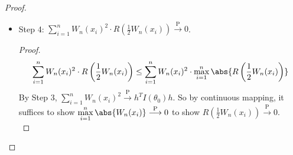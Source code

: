 \documentclass[a4paper]{article}
\begin{document}
\begin{proof}
\begin{itemize}[leftmargin=*]
		\begin{proof}
			Define $A_n(x_i) = W_n(x_i) - \frac{1}{\sqrt{n}} \ \dot{l} (x_i)^T h$. By the variance computation of Step 2, we have $n \cdot \mathbb{E}_{\theta_0} \left[A_n(x_i)^2\right] \to 0$ under $\theta_0$ $(\ast)$. Write
			\begin{equation*}
				\begin{aligned}
					W_n(x_i)^2 &= \left(A_n(x_i) + \frac{1}{\sqrt{n}} \ \dot{l} (x_i)^T h\right)^2 \\
					&= \frac{1}{n} \left(\dot{l} (x_i)^T h\right)^2 + \frac{2}{\sqrt{n}} \dot{l}(x_i)^T h \cdot A_n(x_i) + A_n(x_i)^2.
				\end{aligned}
			\end{equation*}
			Then
			\begin{equation*}
				\sum\limits_{i=1}^n W_n(x_i)^2 = \sum\limits_{i=1}^n \frac{1}{n} \left(\dot{l} (x_i)^T h\right)^2 + \sum\limits_{i=1}^n A_n(x_i)^2 + 2 \cdot \sum\limits_{i=1}^n \frac{1}{\sqrt{n}} \dot{l}(x_i)^T h \cdot A_n(x_i).
			\end{equation*}
			Since
			\begin{itemize}
				\item $\sum\limits_{i=1}^n \frac{1}{n} \left(\dot{l} (x_i)^T h\right)^2 \stackrel{\text{P}}{\longrightarrow} h^T I(\theta_0) h$ by Weak Law of Large Numbers.
				\item $\sum\limits_{i=1}^n A_n(x_i)^2 \stackrel{\text{P}}{\longrightarrow} 0$ by $(\ast)$ and Markov's Inequality.
				\item $ \sum\limits_{i=1}^n \frac{1}{\sqrt{n}} \dot{l}(x_i)^T h \cdot A_n(x_i) \stackrel{\text{P}}{\longrightarrow} 0$ by Cauchy–Schwarz Inequality.
			\end{itemize}
			We conclude that $\sum\limits_{i=1}^n W_n(x_i)^2 \stackrel{\text{P}}{\longrightarrow}h^T I(\theta_0) h$.
		\end{proof}
		\item Step 4: $\sum\limits_{i=1}^n W_n(x_i)^2 \cdot R\left(\frac{1}{2} W_n(x_i) \right) \stackrel{\text{P}}{\longrightarrow} 0$.
		\begin{proof}
			\begin{equation*}
				\sum\limits_{i=1}^n W_n(x_i)^2 \cdot R\left(\frac{1}{2} W_n(x_i) \right) \leq \sum\limits_{i=1}^n W_n(x_i)^2 \cdot \max\limits_{i=1}^n \abs{R\left(\frac{1}{2} W_n(x_i) \right)}
			\end{equation*}
			By Step 3, $\sum\limits_{i=1}^n W_n(x_i)^2 \stackrel{\text{P}}{\longrightarrow}h^T I(\theta_0) h$. So by continuous mapping, it suffices to show $ \max\limits_{i=1}^n \abs{W_n(x_i)} \stackrel{\text{P}}{\longrightarrow} 0$ to show $R\left(\frac{1}{2} W_n(x_i) \right) \stackrel{\text{P}}{\longrightarrow} 0$. \\

\end{proof}
\end{itemize}
\end{proof}
\end{document}
